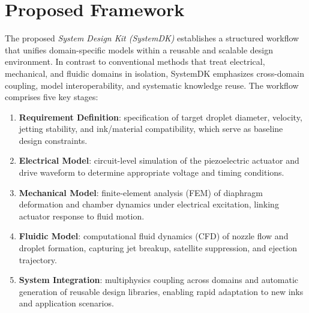 \documentclass[conference]{IEEEtran}
\begin{document}
\section{Proposed Framework}
The proposed \emph{System Design Kit (SystemDK)} establishes a structured workflow that unifies domain-specific models within a reusable and scalable design environment. 
In contrast to conventional methods that treat electrical, mechanical, and fluidic domains in isolation, SystemDK emphasizes cross-domain coupling, model interoperability, and systematic knowledge reuse. 
The workflow comprises five key stages:

\begin{enumerate}
  \item \textbf{Requirement Definition}: specification of target droplet diameter, velocity, jetting stability, and ink/material compatibility, which serve as baseline design constraints.
  \item \textbf{Electrical Model}: circuit-level simulation of the piezoelectric actuator and drive waveform to determine appropriate voltage and timing conditions.
  \item \textbf{Mechanical Model}: finite-element analysis (FEM) of diaphragm deformation and chamber dynamics under electrical excitation, linking actuator response to fluid motion.
  \item \textbf{Fluidic Model}: computational fluid dynamics (CFD) of nozzle flow and droplet formation, capturing jet breakup, satellite suppression, and ejection trajectory.
  \item \textbf{System Integration}: multiphysics coupling across domains and automatic generation of reusable design libraries, enabling rapid adaptation to new inks and application scenarios.
\end{enumerate}
\end{document}
